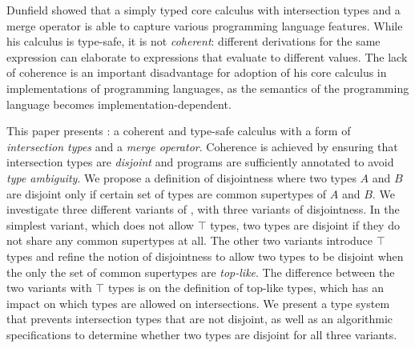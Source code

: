 Dunfield showed that a simply typed core calculus with intersection
types and a merge operator is able to capture various programming
language features. While his calculus is type-safe, it is not
\emph{coherent}: different derivations for the same expression can
elaborate to expressions that evaluate to different values. 
The lack of coherence is an important
disadvantage for adoption of his core calculus in implementations of
programming languages, as the semantics of the programming language
becomes implementation-dependent.

This paper presents \name: a coherent and type-safe calculus with a
form of \emph{intersection types} and a \emph{merge
operator}. Coherence is achieved by ensuring that intersection types
are \emph{disjoint} and programs are sufficiently
annotated to avoid \emph{type ambiguity}. We propose a definition of disjointness where two
types $A$ and $B$ are disjoint only if certain set of types are common
supertypes of $A$ and $B$. We investigate three different variants of
\name, with three variants of disjointness. In the simplest
variant, which does not allow $\top$ types, two types are disjoint if
they do not share any common supertypes at all. The other two variants
introduce $\top$ types and refine the notion of disjointness to allow
two types to be disjoint when the only the set of common supertypes are
\emph{top-like}. The difference between the two variants with $\top$
types is on the definition of top-like types, which has an impact on
which types are allowed on intersections. We present a type system
that prevents intersection types that are not disjoint, as well as an
algorithmic specifications to determine whether two types are disjoint
for all three variants.
